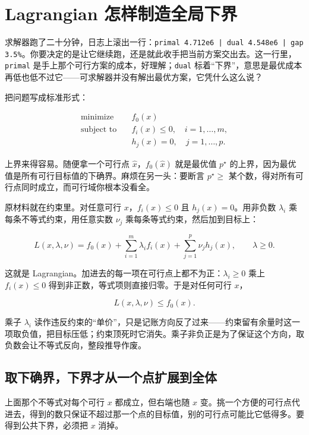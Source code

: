 \section{Lagrangian 怎样制造全局下界}
\label{sec:09-Convex-Optimization/05-Duality/01}

求解器跑了二十分钟，日志上滚出一行：\texttt{primal 4.712e6 | dual 4.548e6 | gap 3.5\%}。你要决定的是让它继续跑，还是就此收手把当前方案交出去。这一行里，\texttt{primal} 是手上那个可行方案的成本，好理解；\texttt{dual} 标着``下界''，意思是最优成本再低也低不过它——可求解器并没有解出最优方案，它凭什么这么说？

把问题写成标准形式：

\[
\begin{aligned}
\text{minimize}\quad&f_0(x)\\
\text{subject to}\quad&
f_i(x)\le0,\quad i=1,\ldots,m,\\
&h_j(x)=0,\quad j=1,\ldots,p.
\end{aligned}
\]

上界来得容易。随便拿一个可行点 \(\hat x\)，\(f_0(\hat x)\) 就是最优值 \(p^\star\) 的上界，因为最优值是所有可行目标值的下确界。麻烦在另一头：要断言 \(p^\star\ge\) 某个数，得对所有可行点同时成立，而可行域你根本没看全。

原材料就在约束里。对任意可行 \(x\)，\(f_i(x)\le0\) 且 \(h_j(x)=0\)。用非负数 \(\lambda_i\) 乘每条不等式约束，用任意实数 \(\nu_j\) 乘每条等式约束，然后加到目标上：

\[
L(x,\lambda,\nu) = f_0(x)
+\sum_{i=1}^m\lambda_i f_i(x)
+\sum_{j=1}^p\nu_j h_j(x),
\qquad \lambda\ge0.
\]

这就是 Lagrangian。加进去的每一项在可行点上都不为正：\(\lambda_i\ge0\) 乘上 \(f_i(x)\le0\) 得到非正数，等式项则直接归零。于是对任何可行 \(x\)，

\[
L(x,\lambda,\nu)\le f_0(x).
\]

乘子 \(\lambda_i\) 读作违反约束的``单价''，只是记账方向反了过来——约束留有余量时这一项取负值，把目标压低；约束顶死时它消失。乘子非负正是为了保证这个方向，取负数会让不等式反向，整段推导作废。

\subsection{取下确界，下界才从一个点扩展到全体}

上面那个不等式对每个可行 \(x\) 都成立，但右端也随 \(x\) 变。挑一个方便的可行点代进去，得到的数只保证不超过那一个点的目标值，别的可行点可能比它低得多。要得到公共下界，必须把 \(x\) 消掉。

